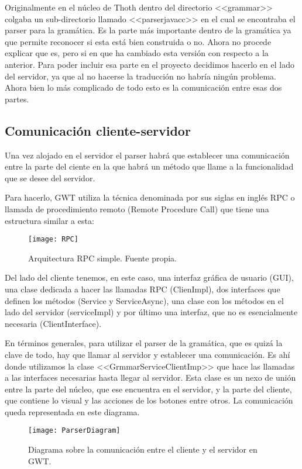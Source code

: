 Originalmente en el núcleo de Thoth dentro del directorio <<grammar>> colgaba un sub-directorio llamado <<parserjavacc>> en el cual se encontraba el parser para la gramática. Es la parte más importante dentro de la gramática ya que permite reconocer si esta está bien construida o no.
Ahora no procede explicar que es, pero si en que ha cambiado esta versión con respecto a la anterior. 
Para poder incluir esa parte en el proyecto decidimos hacerlo en el lado del servidor, ya que al no hacerse la traducción no habría ningún problema. Ahora bien lo más complicado de todo esto es la comunicación entre esas dos partes.



\subsection{Comunicación cliente-servidor}
Una vez alojado en el servidor el parser habrá que establecer una comunicación entre la parte del ciente en la que habrá un método que llame a la funcionalidad que se desee del servidor.

Para hacerlo, GWT utiliza la técnica denominada por sus siglas en inglés RPC o llamada de procedimiento remoto (Remote Procedure Call) que tiene una estructura similar a esta: 

\begin{figure}[h]
\centering
\texttt{[image: RPC]}
\caption{Arquitectura RPC simple. Fuente propia.}
\label{fig:5.1}
\end{figure}

Del lado del cliente tenemos, en este caso, una interfaz gráfica de usuario (GUI), una clase dedicada a hacer las llamadas RPC (ClienImpl), dos interfaces que definen los métodos (Service y ServiceAsync), una clase con los métodos en el lado del servidor (serviceImpl) y por último una interfaz, que no es esencialmente necesaria (ClientInterface). 

En términos generales, para utilizar el parser de la gramática, que es quizá la clave de todo, hay que llamar al servidor y establecer una comunicación. Es ahí donde utilizamos la clase <<GrmmarServiceClientImp>> que hace las llamadas a las interfaces necesarias hasta llegar al servidor. Esta clase es un nexo de unión entre la parte del núcleo, que ese encuentra en el servidor, y la parte del cliente, que contiene lo visual y las acciones de los botones entre otros. La comunicación queda representada en este diagrama.

\begin{figure}[h]
\centering
\texttt{[image: ParserDiagram]}
\caption{Diagrama sobre la comunicación entre el cliente y el servidor en GWT.}
\label{fig:5.1}
\end{figure}

